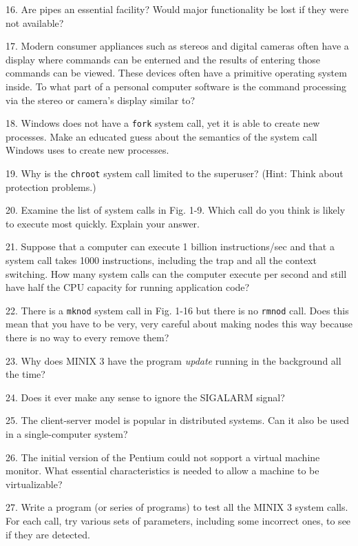 \documentclass{book}
\newcommand {\sys} [1] {\textsl{#1}}
\newcommand {\cmd} [1] {\texttt{#1}}
\begin{document}
16. Are pipes an essential facility? Would major functionality be lost if they were not available?

17. Modern consumer appliances such as stereos and digital cameras often have a display 
where commands can be enterned and the results of entering those commands can be viewed.
These devices often have a primitive operating system inside.
To what part of a personal computer software is the command processing via the stereo or camera's display similar to?

18. Windows does not have a \cmd{fork} system call, yet it is able to create new processes.
Make an educated guess about the semantics of the system call Windows uses to create new processes.

19. Why is the \cmd{chroot} system call limited to the superuser? (Hint: Think about protection problems.)

20. Examine the list of system calls in Fig. 1-9.
Which call do you think is likely to execute most quickly.
Explain your answer.

21. Suppose that a computer can execute 1 billion instructions/sec and that a system call takes 1000 instructions,
including the trap and all the context switching.
How many system calls can the computer execute per second and still have half the CPU  capacity for running application code?

22. There is a \cmd{mknod} system call in Fig. 1-16 but there is no \cmd{rmnod} call.
Does this mean that you have to be very, very careful about making nodes this way because there is no way to every remove them?

23. Why does MINIX 3 have the program \sys{update} running in the background all the time?

24. Does it ever make any sense to ignore the SIGALARM signal?

25. The client-server model is popular in distributed systems.
Can it also be used in a single-computer system?

26. The initial version of the Pentium could not sopport a virtual machine monitor.
What essential characteristics is needed to allow a machine to be virtualizable?

27. Write a program (or series of programs) to test all the MINIX 3 system calls.
For each call, try various sets of parameters, including some incorrect ones, to see if they are detected.
\end{document}
